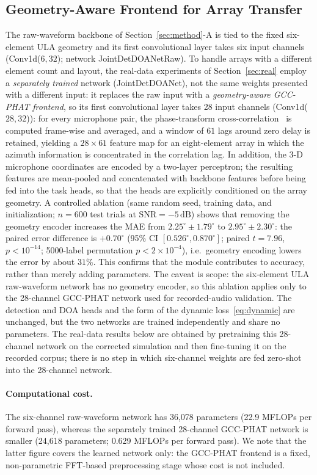 \documentclass[sensors,article,submit,pdftex,moreauthors]{Definitions/mdpi}
\begin{document}
\subsection{Geometry-Aware Frontend for Array Transfer}
\label{sec:geo}
The raw-waveform backbone of Section~\ref{sec:method}-A is tied to the fixed six-element ULA geometry and its first convolutional layer takes six input channels (Conv1d($6,32$); network JointDetDOANetRaw). To handle arrays with a different element count and layout, the real-data experiments of Section~\ref{sec:real} employ a \emph{separately trained} network (JointDetDOANet), not the same weights presented with a different input: it replaces the raw input with a \emph{geometry-aware GCC-PHAT frontend}, so its first convolutional layer takes 28 input channels (Conv1d($28,32$)): for every microphone pair, the phase-transform cross-correlation~\cite{knapp1976gcc} is computed frame-wise and averaged, and a window of $61$ lags around zero delay is retained, yielding a $28\times61$ feature map for an eight-element array in which the azimuth information is concentrated in the correlation lag. In addition, the 3-D microphone coordinates are encoded by a two-layer perceptron; the resulting features are mean-pooled and concatenated with backbone features before being fed into the task heads, so that the heads are explicitly conditioned on the array geometry. A controlled ablation (same random seed, training data, and initialization; $n=600$ test trials at $\mathrm{SNR}=-5\,\mathrm{dB}$) shows that removing the geometry encoder increases the MAE from $2.25^\circ\pm1.79^\circ$ to $2.95^\circ\pm2.30^\circ$: the paired error difference is $+0.70^\circ$ (95\% CI $[0.526^\circ,0.870^\circ]$; paired $t=7.96$, $p<10^{-14}$; 5000-label permutation $p<2\times10^{-4}$), i.e.\ geometry encoding lowers the error by about $31\%$. This confirms that the module contributes to accuracy, rather than merely adding parameters. The caveat is scope: the six-element ULA raw-waveform network has no geometry encoder, so this ablation applies only to the 28-channel GCC-PHAT network used for recorded-audio validation. The detection and DOA heads and the form of the dynamic loss~\eqref{eq:dynamic} are unchanged, but the two networks are trained independently and share no parameters. The real-data results below are obtained by pretraining this 28-channel network on the corrected simulation and then fine-tuning it on the recorded corpus; there is no step in which six-channel weights are fed zero-shot into the 28-channel network.
\paragraph{Computational cost.}
The six-channel raw-waveform network has 36,078 parameters (22.9 MFLOPs per forward pass), whereas the separately trained 28-channel GCC-PHAT network is smaller (24,618 parameters; 0.629 MFLOPs per forward pass). We note that the latter figure covers the learned network only: the GCC-PHAT frontend is a fixed, non-parametric FFT-based preprocessing stage whose cost is not included.
\end{document}
